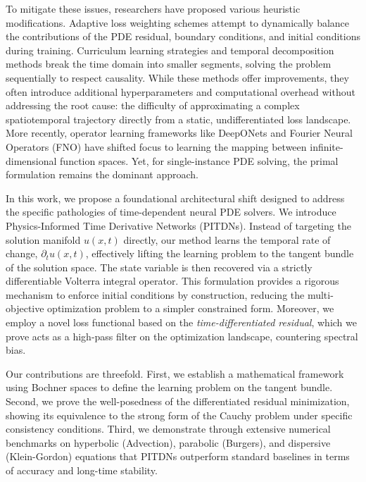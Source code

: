 \documentclass[11pt,reqno]{amsart}
\theoremstyle{plain}
\theoremstyle{definition}
\theoremstyle{remark}
\begin{document}
To mitigate these issues, researchers have proposed various heuristic modifications. Adaptive loss weighting schemes \cite{xiang2022, wight2020, mcclenny2023} attempt to dynamically balance the contributions of the PDE residual, boundary conditions, and initial conditions during training. Curriculum learning strategies \cite{krishnapriyan2021} and temporal decomposition methods \cite{jagtap2020, meng2020, shukla2021} break the time domain into smaller segments, solving the problem sequentially to respect causality. While these methods offer improvements, they often introduce additional hyperparameters and computational overhead without addressing the root cause: the difficulty of approximating a complex spatiotemporal trajectory directly from a static, undifferentiated loss landscape. More recently, operator learning frameworks like DeepONets \cite{lu2021deeponet} and Fourier Neural Operators (FNO) \cite{li2020fourier, kovachki2021} have shifted focus to learning the mapping between infinite-dimensional function spaces. Yet, for single-instance PDE solving, the primal formulation remains the dominant approach.

In this work, we propose a foundational architectural shift designed to address the specific pathologies of time-dependent neural PDE solvers. We introduce Physics-Informed Time Derivative Networks (PITDNs). Instead of targeting the solution manifold $u(x,t)$ directly, our method learns the temporal rate of change, $\partial_t u(x,t)$, effectively lifting the learning problem to the tangent bundle of the solution space. The state variable is then recovered via a strictly differentiable Volterra integral operator. This formulation provides a rigorous mechanism to enforce initial conditions by construction, reducing the multi-objective optimization problem to a simpler constrained form. Moreover, we employ a novel loss functional based on the \textit{time-differentiated residual}, which we prove acts as a high-pass filter on the optimization landscape, countering spectral bias.

Our contributions are threefold. First, we establish a mathematical framework using Bochner spaces to define the learning problem on the tangent bundle. Second, we prove the well-posedness of the differentiated residual minimization, showing its equivalence to the strong form of the Cauchy problem under specific consistency conditions. Third, we demonstrate through extensive numerical benchmarks on hyperbolic (Advection), parabolic (Burgers), and dispersive (Klein-Gordon) equations that PITDNs outperform standard baselines in terms of accuracy and long-time stability.
\end{document}
